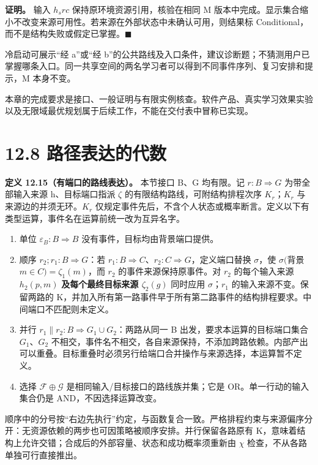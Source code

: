\documentclass[UTF8,a4paper,zihao=-4,fontset=windows,openany]{ctexbook}
\def\mathrm#1{#1}%
\begin{document}
\textbf{证明。} 输入 \(h_\mathrm{src}\) 保持原环境资源引用，核验在相同 M 版本中完成。显示集合缩小不改变来源可用性。若来源在外部状态中未确认可用，则结果标 Conditional，而不是结构失败或假定已掌握。\(\blacksquare\)

冷启动可展示“经 a”或“经 b”的公共路线及入口条件，建议诊断题；不猜测用户已掌握哪条入口。同一共享空间的两名学习者可以得到不同事件序列、复习安排和提示，M 本身不变。

本章的完成要求是接口、一般证明与有限实例核查。软件产品、真实学习效果实验以及无限域最优规划属于后续工作，不能在交付表中冒称已实现。

\section{12.8 路径表达的代数}
\textbf{定义 12.15（有端口的路线表达）。} 本节接口 B、G 均有限。记 \(r:B\Rightarrow G\) 为带全部输入来源 h、目标端口指派 \(\zeta\) 的有限结构路线，可附结构排程次序 \(K_r\)；\(K_r\) 与来源边的并须无环。\(K_r\) 仅规定事件先后，不含个人状态或概率断言。定义以下有类型运算，事件名在运算前统一改为互异名字。

\begin{enumerate}
\item 单位 \(\varepsilon_B:B\Rightarrow B\) 没有事件，目标均由背景端口提供。
\item 顺序 \(r_{2};r_{1}:B\Rightarrow G\)：若 \(r_{1}:B\Rightarrow C\)、\(r_{2}:C\Rightarrow G\)，定义端口替换 \(\sigma\)，使 \(\sigma(\)背景 \(m\in C)=\zeta_{1}(m)\)，而 \(r_{2}\) 的事件来源保持原事件。对 \(r_{2}\) 的每个输入来源 \(h_{2}(p,m)\) \textbf{及每个最终目标来源 \(\zeta_{2}(g)\)} 同时应用 \(\sigma\)；\(r_{1}\) 的输入来源不变。保留两路的 K，并加入所有第一路事件早于所有第二路事件的结构排程要求。中间端口不匹配则未定义。
\item 并行 \(r_{1}\parallel r_{2}:B\Rightarrow G_{1}\cup G_{2}\)：两路从同一 B 出发，要求本运算的目标端口集合 \(G_{1}\)、\(G_{2}\) 不相交，事件名不相交，各自来源保持，不添加跨路依赖。内部产出可以重叠。目标重叠时必须另行给端口合并操作与来源选择，本运算暂不定义。
\item 选择 \(\mathcal{F}\oplus\mathcal{G}\) 是相同输入/目标接口的路线族并集；它是 OR。单一行动的输入集合仍是 AND，不因选择运算改变。
\end{enumerate}
顺序中的分号按“右边先执行”约定，与函数复合一致。严格排程约束与来源偏序分开：无资源依赖的两步也可因策略被顺序安排。并行保留各路原有 K，意味着结构上允许交错；合成后的外部容量、状态和成功概率须重新由 \(\chi\) 检查，不从各路单独可行直接推出。
\end{document}
